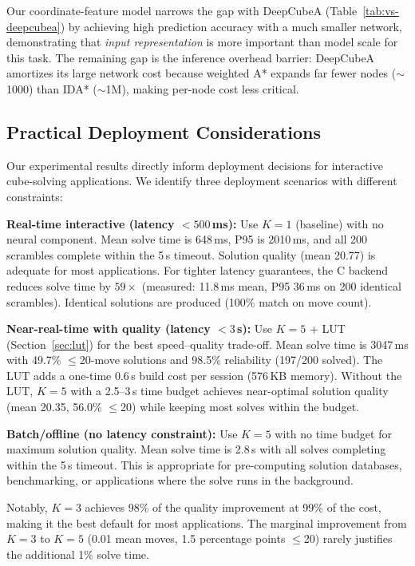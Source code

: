 \documentclass[conference]{IEEEtran}
\begin{document}
Our coordinate-feature model narrows the gap with DeepCubeA (Table~\ref{tab:vs-deepcubea}) by achieving high prediction accuracy with a much smaller network, demonstrating that \emph{input representation} is more important than model scale for this task. The remaining gap is the inference overhead barrier: DeepCubeA amortizes its large network cost because weighted A* expands far fewer nodes ($\sim$1000) than IDA* ($\sim$1M), making per-node cost less critical.

\subsection{Practical Deployment Considerations}
\label{sec:deployment}

Our experimental results directly inform deployment decisions for interactive cube-solving applications. We identify three deployment scenarios with different constraints:

\textbf{Real-time interactive (latency $< 500$\,ms):} Use $K{=}1$ (baseline) with no neural component. Mean solve time is 648\,ms, P95 is 2010\,ms, and all 200 scrambles complete within the 5\,s timeout. Solution quality (mean 20.77) is adequate for most applications. For tighter latency guarantees, the C backend reduces solve time by $59\times$ (measured: 11.8\,ms mean, P95 36\,ms on 200 identical scrambles). Identical solutions are produced (100\% match on move count).

\textbf{Near-real-time with quality (latency $< 3$\,s):} Use $K{=}5$ + LUT (Section~\ref{sec:lut}) for the best speed--quality trade-off. Mean solve time is 3047\,ms with 49.7\% $\leq$20-move solutions and 98.5\% reliability (197/200 solved). The LUT adds a one-time 0.6\,s build cost per session (576\,KB memory). Without the LUT, $K{=}5$ with a 2.5--3\,s time budget achieves near-optimal solution quality (mean 20.35, 56.0\% $\leq$20) while keeping most solves within the budget.

\textbf{Batch/offline (no latency constraint):} Use $K{=}5$ with no time budget for maximum solution quality. Mean solve time is 2.8\,s with all solves completing within the 5\,s timeout. This is appropriate for pre-computing solution databases, benchmarking, or applications where the solve runs in the background.

Notably, $K{=}3$ achieves 98\% of the quality improvement at 99\% of the cost, making it the best default for most applications. The marginal improvement from $K{=}3$ to $K{=}5$ (0.01 mean moves, 1.5 percentage points $\leq$20) rarely justifies the additional 1\% solve time.
\end{document}
